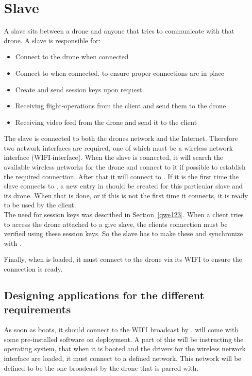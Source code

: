 \section{Slave}
\label{sec:design_slave}

A slave sits between a drone and anyone that tries to communicate with that drone.
A slave is responsible for:

\begin{itemize}
	\item Connect to the drone when connected
	\item Connect to  when connected, to ensure proper connections are in place
	\item Create and send session keys upon request
	\item Receiving flight-operations from the client and send them to the drone
	\item Receiving video feed from the drone and send it to the client
\end{itemize}

The slave is connected to both the drones network and the Internet.
Therefore two network interfaces are required, one of which must be a wireless network interface (WIFI-interface).
When the slave is connected, it will search the available wireless networks for the drone and connect to it if possible to establish the required connection.
After that it will connect to .
If it is the first time the slave connects to , a new entry in  should be created for this particular slave and its drone.
When that is done, or if this is not the first time it connects, it is ready to be used by the client. \\

The need for session keys was described in Section~\ref{qwe123}. 
When a client tries to access the drone attached to a give slave, the clients connection must be verified using these session keys.
So the slave has to make these and synchronize with .

Finally, when  is loaded, it must connect to the drone via its WIFI to ensure the connection is ready. \\

\subsection{Designing applications for the different requirements}
As soon as  boots, it should connect to the WIFI broadcast by .
 will come with some pre-installed software on deployment.
A part of this will be instructing the operating system, that when it is booted and the drivers for the wireless network interface are loaded, it must connect to a defined network.
This network will be defined to be the one broadcast by the drone that  is parred with. \\

